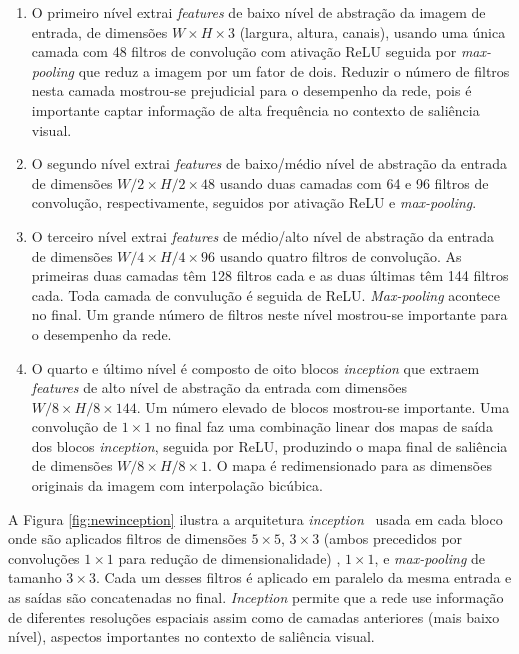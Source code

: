 \documentclass[11pt]{article}
\newcommand{\tit}[1]{\textit{#1}}
\begin{document}
\begin{enumerate}
    \item O primeiro nível extrai \tit{features} de baixo nível de abstração
        da imagem de entrada, de dimensões
        $W\times H \times 3$ (largura, altura, canais), usando uma única
        camada com 48 filtros de convolução com ativação ReLU seguida por
        \tit{max-pooling} que reduz a imagem por um fator de dois.
        Reduzir o número de filtros nesta camada mostrou-se prejudicial para
        o desempenho da rede, pois é importante captar informação de
        alta frequência no contexto de saliência visual.
    \item O segundo nível extrai \tit{features} de baixo/médio nível de
        abstração da entrada de dimensões $W/2 \times H/2 \times 48$
        usando duas camadas com 64 e 96 filtros de convolução, respectivamente,
        seguidos por ativação ReLU e \tit{max-pooling}.
    \item O terceiro nível extrai \tit{features} de médio/alto nível de
        abstração da entrada de dimensões $W/4 \times H/4 \times 96$ usando
        quatro filtros de convolução.
        As primeiras duas camadas têm 128 filtros cada e as duas últimas
        têm 144 filtros cada. Toda camada de convulução é seguida de ReLU.
        \tit{Max-pooling} acontece no final.
        Um grande número de filtros neste nível mostrou-se importante para
        o desempenho da rede.
    \item O quarto e último nível é composto de oito blocos \tit{inception}
        que extraem \tit{features} de alto nível de abstração da entrada
        com dimensões $W/8 \times H/8 \times 144$.
        Um número elevado de blocos mostrou-se importante.
        Uma convolução de $1 \times 1$ no final faz uma combinação linear
        dos mapas de saída dos blocos \tit{inception}, seguida por ReLU,
        produzindo o mapa final de saliência de dimensões
        $W/8 \times H/8 \times 1$.
        O mapa é redimensionado para as dimensões originais da imagem
        com interpolação bicúbica.
\end{enumerate}

A Figura \ref{fig:newinception} ilustra a arquitetura
\tit{inception}~\cite{szegedy_2014}
usada em cada bloco onde são aplicados
filtros de dimensões $5 \times 5$, $3 \times 3$
(ambos precedidos por convoluções $1\times 1$ para redução de dimensionalidade)
, $1 \times 1$, e \tit{max-pooling} de tamanho $3 \times 3$.
Cada um desses filtros é aplicado em paralelo da mesma entrada e as saídas
são concatenadas no final.
\tit{Inception} permite que a rede use informação de diferentes resoluções
espaciais assim como de camadas anteriores (mais baixo nível),
aspectos importantes no contexto de saliência visual.
\end{document}
